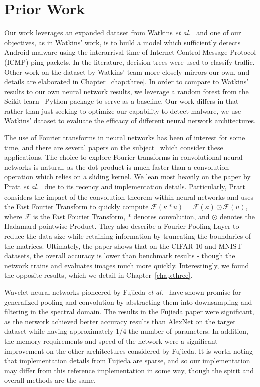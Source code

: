 \section{Prior Work}
Our work leverages an expanded dataset from Watkins \textit{et al.}~\cite{watkins2013using} and one of our objectives, as in Watkins' work, is to build a model which sufficiently detects Android malware using the interarrival time of Internet Control Message Protocol (ICMP) ping packets.
In the literature, decision trees were used to classify traffic.
Other work on the dataset by Watkins' team more closely mirrors our own, and details are elaborated in Chapter~\ref{chap:three}.
In order to compare to Watkins' results to our own neural network results, we leverage a random forest from the Scikit-learn~\cite{scikit-learn} Python package to serve as a baseline.
Our work differs in that rather than just seeking to optimize our capability to detect malware, we use Watkins' dataset to evaluate the efficacy of different neural network architectures.

The use of Fourier transforms in neural networks has been of interest for some time, and there are several papers on the subject~\cite{osowski2002fourier, pratt2017fcnn, highlander2016very} which consider these applications.
The choice to explore Fourier transforms in convolutional neural networks is natural, as the dot product is much faster than a convolution operation which relies on a sliding kernel. 
We lean most heavily on the paper by Pratt \textit{et al.}~\cite{pratt2017fcnn} due to its recency and implementation details. 
Particularly, Pratt considers the impact of the convolution theorem within neural networks and uses the Fast Fourier Transform to quickly compute $\mathcal{F}(\kappa * u) = \mathcal{F}(\kappa) \odot \mathcal{F}(u)$, where $\mathcal{F}$ is the Fast Fourier Transform, $*$ denotes convolution, and $\odot$ denotes the Hadamard pointwise Product.
They also describe a Fourier Pooling Layer to reduce the data size while retaining information by truncating the boundaries of the matrices.
Ultimately, the paper shows that on the CIFAR-10 and MNIST datasets, the overall accuracy is lower than benchmark results - though the network trains and evaluates images much more quickly.
Interestingly, we found the opposite results, which we detail in Chapter~\ref{chap:three}.

Wavelet neural networks pioneered by Fujieda \textit{et al.}~\cite{fujieda2017wavelet} have shown promise for generalized pooling and convolution by abstracting them into downsampling and filtering in the spectral domain.
The results in the Fujieda paper were significant, as the network achieved better accuracy results than AlexNet on the target dataset while having approximately 1/4 the number of parameters.
In addition, the memory requirements and speed of the network were a significant improvement on the other architectures considered by Fujieda.
It is worth noting that implementation details from Fujieda are sparse, and so our implementation may differ from this reference implementation in some way, though the spirit and overall methods are the same.

